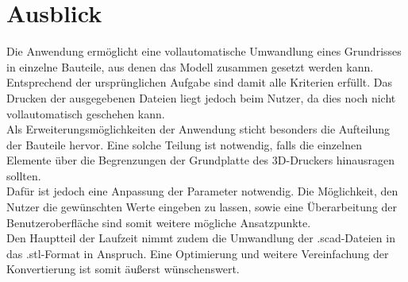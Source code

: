 \chapter{Ausblick}
Die Anwendung ermöglicht eine vollautomatische Umwandlung eines Grundrisses in einzelne Bauteile, aus denen das Modell zusammen gesetzt werden kann.
Entsprechend der ursprünglichen Aufgabe sind damit alle Kriterien erfüllt.
Das Drucken der ausgegebenen Dateien liegt jedoch beim Nutzer, da dies noch nicht vollautomatisch geschehen kann. \\
Als Erweiterungsmöglichkeiten der Anwendung sticht besonders die Aufteilung der Bauteile hervor.
Eine solche Teilung ist notwendig, falls die einzelnen Elemente über die Begrenzungen der Grundplatte des 3D-Druckers hinausragen sollten. \\
Dafür ist jedoch eine Anpassung der Parameter notwendig.
Die Möglichkeit, den Nutzer die gewünschten Werte eingeben zu lassen, sowie eine Überarbeitung der Benutzeroberfläche sind somit weitere mögliche Ansatzpunkte. \\
Den Hauptteil der Laufzeit nimmt zudem die Umwandlung der .scad-Dateien in das .stl-Format in Anspruch.
Eine Optimierung und weitere Vereinfachung der Konvertierung ist somit äußerst wünschenswert.

